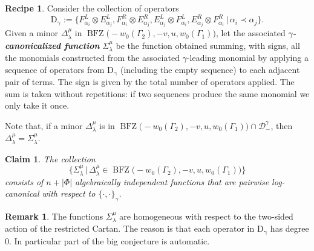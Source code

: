 \documentclass[a4paper]{amsart}
\newtheorem{claim}[theorem]{Claim}
\theoremstyle{definition}
\newtheorem{recipe}[theorem]{Recipe}
\newtheorem{remark}[theorem]{Remark}
\newcommand{\newword}[1]{\textbf{\emph{#1}}}
\begin{document}
\begin{recipe}
  Consider the collection of operators 
  \[
    \operatorname{D_\gamma}:=\Big\{ 
      F_{\alpha_i}^L\otimes E_{\alpha_j}^L, 
      F_{\alpha_i}^R\otimes E_{\alpha_j}^R, 
      E_{\alpha_j}^L\otimes F_{\alpha_i}^L, 
      E_{\alpha_j}^R\otimes F_{\alpha_i}^R
      \,\big|\,\alpha_i\prec\alpha_j
    \Big\}.
  \]
  Given a minor $\Delta_\lambda^\mu$ in $\operatorname{BFZ}\big(-w_0(\Gamma_2),-v,u,w_0(\Gamma_1)\big)$, let the associated \newword{$\gamma$-canonicalized function} $\Sigma_\lambda^\mu$  be the function obtained summing, with signs, all the monomials constructed from the associated $\gamma$-leading monomial by applying a sequence of operators from $\operatorname{D_\gamma}$ (including the empty sequence) to each adjacent pair of terms.
  The sign is given by the total number of operators applied.
  The sum is taken without repetitions: if two sequences produce the same monomial we only take it once.
\end{recipe}

Note that, if a minor $\Delta_\lambda^\mu$ is in $\operatorname{BFZ}\big(-w_0(\Gamma_2),-v,u,w_0(\Gamma_1)\big)\cap \mathcal{D}^\gamma_-$, then $\Delta_\lambda^\mu=\Sigma_\lambda^\mu$.

\begin{claim}
  The collection
  \[
    \Big\{
      \Sigma_\lambda^\mu\,\big|\, \Delta_\lambda^\mu\in \operatorname{BFZ}\big(-w_0(\Gamma_2),-v,u,w_0(\Gamma_1)\big)
    \Big\}
  \]
  consists of $n+|\Phi|$ algebraically independent functions that are pairwise log-canonical with respect to $\{\cdot,\cdot\}_\gamma$.
\end{claim}

\begin{remark}
  The functions $\Sigma_\lambda^\mu$ are homogeneous with respect to the two-sided action of the restricted Cartan.
  The reason is that each operator in $\operatorname{D_\gamma}$ has degree 0.
  In particular part of the big conjecture is automatic.
\end{remark}
\end{document}
